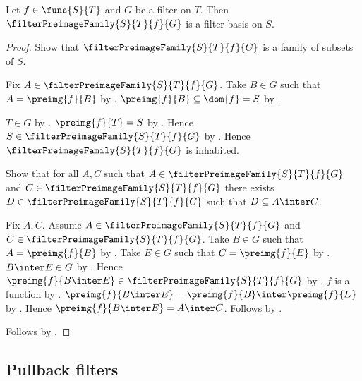 \begin{proposition}\label{filter_preimage_family_is_filter_basis}
    Let $f\in\funs{S}{T}$ and $G$ be a filter on $T$.
    Then $\filterPreimageFamily{S}{T}{f}{G}$ is a filter basis on $S$.
\end{proposition}
\begin{proof}
    Show that $\filterPreimageFamily{S}{T}{f}{G}$ is a family of subsets
        of $S$.
    \begin{subproof}
        Fix $A\in\filterPreimageFamily{S}{T}{f}{G}$.
        Take $B\in G$ such that $A=\preimg{f}{B}$ by
            .
        $\preimg{f}{B}\subseteq\dom{f}=S$ by
            .
    \end{subproof}

    $T\in G$ by .
    $\preimg{f}{T}=S$ by .
    Hence $S\in\filterPreimageFamily{S}{T}{f}{G}$ by
        .
    Hence $\filterPreimageFamily{S}{T}{f}{G}$ is inhabited.

    Show that for all $A,C$ such that
        $A\in\filterPreimageFamily{S}{T}{f}{G}$ and
        $C\in\filterPreimageFamily{S}{T}{f}{G}$ there exists
        $D\in\filterPreimageFamily{S}{T}{f}{G}$ such that
        $D\subseteq A\inter C$.
    \begin{subproof}
        Fix $A,C$.
        Assume $A\in\filterPreimageFamily{S}{T}{f}{G}$ and
            $C\in\filterPreimageFamily{S}{T}{f}{G}$.
        Take $B\in G$ such that $A=\preimg{f}{B}$ by
            .
        Take $E\in G$ such that $C=\preimg{f}{E}$ by
            .
        $B\inter E\in G$ by .
        Hence $\preimg{f}{B\inter E}
            \in\filterPreimageFamily{S}{T}{f}{G}$ by
            .
        $f$ is a function by .
        $\preimg{f}{B\inter E}
            =\preimg{f}{B}\inter\preimg{f}{E}$ by
            .
        Hence $\preimg{f}{B\inter E}=A\inter C$.
        Follows by .
    \end{subproof}
    Follows by .
\end{proof}

\subsection{Pullback filters}

